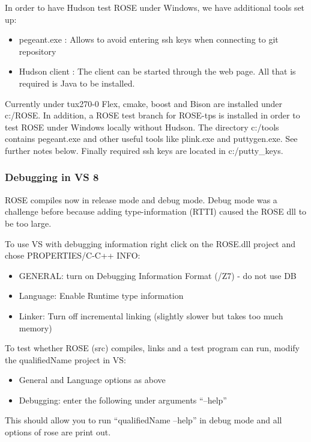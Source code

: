 In order to have Hudson test ROSE under Windows, we have additional tools set up:

\begin{itemize}
\item pegeant.exe : Allows to avoid entering ssh keys when connecting to git repository
\item Hudson client : The client can be started through the web page. All that is required is Java to be installed.
\end{itemize}

Currently under tux270-0 Flex, cmake, boost and Bison are installed under c:/ROSE. In
addition, a ROSE test branch for ROSE-tps is installed in order to test ROSE under
Windows locally without Hudson. The directory c:/tools contains pegeant.exe and other
useful tools like plink.exe and puttygen.exe. See further notes below. Finally
required ssh keys are located in c:/putty\_keys.

\subsubsection{Debugging in VS 8}

ROSE compiles now in release mode and debug mode. Debug mode was a challenge before because adding type-information (RTTI) caused the ROSE dll to be too large. 

To use VS with debugging information right click on the ROSE.dll project and chose PROPERTIES/C-C++ INFO:

\begin{itemize}
    \item GENERAL: turn on Debugging Information Format (/Z7) - do not use DB
    \item Language: Enable Runtime type information
    \item Linker: Turn off incremental linking (slightly slower but takes too much memory) 
\end{itemize}


To test whether ROSE (src) compiles, links and a test program can run, modify the qualifiedName project in VS:
\begin{itemize}
    \item General and Language options as above
    \item Debugging: enter the following under arguments ``--help'' 
\end{itemize}

This should allow you to run ``qualifiedName --help'' in debug mode and all options of rose are print out. 




